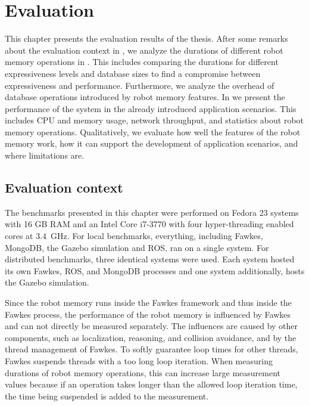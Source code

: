\chapter{Evaluation}
\label{chap:evaluation}
This chapter presents the evaluation results of the thesis. After some
remarks about the evaluation context in , we
analyze the durations of different robot memory operations in
. This includes comparing the durations for
different expressiveness levels and database sizes to find a
compromise between expressiveness and performance. Furthermore, we
analyze the overhead of database operations introduced by robot memory
features. In  we present the performance of
the system in the already introduced application scenarios. This
includes CPU and memory usage, network throughput, and statistics
about robot memory operations. Qualitatively, we evaluate how well the
features of the robot memory work, how it can support the development
of application scenarios, and where limitations are.

\section{Evaluation context}
\label{sec:eval-context}
The benchmarks presented in this chapter were performed on Fedora 23
systems with 16 GB RAM and an Intel Core i7-3770 with four hyper-threading enabled cores at
$3.4$~GHz. For local benchmarks, everything, including Fawkes, MongoDB,
the Gazebo simulation and ROS, ran on a single system. For distributed
benchmarks, three identical systems were used. Each system hosted its
own Fawkes, ROS, and MongoDB processes and one system additionally,
hosts the Gazebo simulation.

Since the robot memory runs inside the Fawkes framework and thus
inside the Fawkes process, the performance of the robot memory is
influenced by Fawkes and can not directly be measured separately. The
influences are caused by other components, such as localization,
reasoning, and collision avoidance, and by the thread management of
Fawkes. To softly guarantee loop times for other threads, Fawkes
suspends threads with a too long loop iteration. When measuring
durations of robot memory operations, this can increase large
measurement values because if an operation takes longer than the
allowed loop iteration time, the time being suspended is added to the
measurement.

